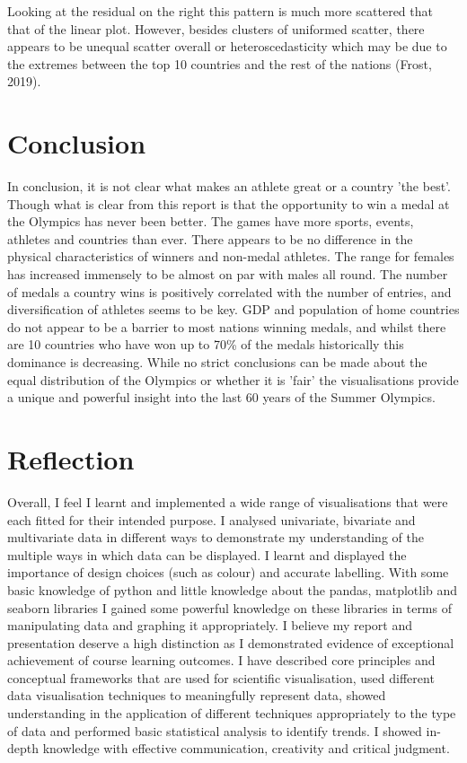 \documentclass[a4 paper, 12pt]{article}
\begin{document}
        Looking at the residual on the right this pattern is much more scattered that that of the linear plot. However, besides clusters of uniformed scatter, there appears to be unequal scatter overall or heteroscedasticity which may be due to the extremes between the top 10 countries and the rest of the nations (Frost, 2019). 
        
    \section{Conclusion}  
    In conclusion, it is not clear what makes an athlete great or a country 'the best'. Though what is clear from this report is that the opportunity to win a medal at the Olympics has never been better. The games have more sports, events, athletes and countries than ever. There appears to be no difference in the physical characteristics of winners and non-medal athletes. The range for females has increased immensely to be almost on par with males all round. The number of medals a country wins is positively correlated with the number of entries, and diversification of athletes seems to be key. GDP and population of home countries do not appear to be a barrier to most nations winning medals, and whilst there are 10 countries who have won up to 70\% of the medals historically this dominance is decreasing. While no strict conclusions can be made about the equal distribution of the Olympics or whether it is 'fair' the visualisations provide a unique and powerful insight into the last 60 years of the Summer Olympics. 

    \section{Reflection}
    Overall, I feel I learnt and implemented a wide range of visualisations that were each fitted for their intended purpose. I analysed univariate, bivariate and multivariate data in different ways to demonstrate my understanding of the multiple ways in which data can be displayed. I learnt and displayed the importance of design choices (such as colour) and accurate labelling. With some basic knowledge of python and little knowledge about the pandas, matplotlib and seaborn libraries I gained some powerful knowledge on these libraries in terms of manipulating data and graphing it appropriately. I believe my report and presentation deserve a high distinction as I demonstrated evidence of exceptional achievement of course learning outcomes. I have described core principles and conceptual frameworks that are used for scientific visualisation, used different data visualisation techniques to meaningfully represent data, showed understanding in the application of different techniques appropriately to the type of data and performed basic statistical analysis to identify trends. I showed in-depth knowledge with effective communication, creativity and critical judgment.
\end{document}
